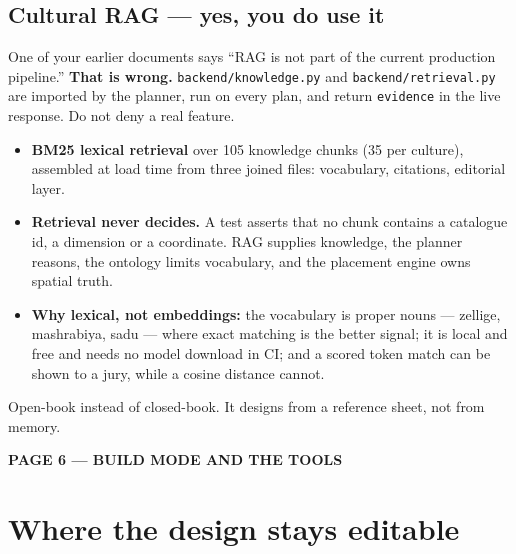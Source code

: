 \documentclass[10.5pt,a4paper]{article}
\newcommand{\pagelabel}[2]{%
  {\sffamily\bfseries\scriptsize\color{brass}\MakeUppercase{Page #1 --- #2}}\par\vspace{0.2em}}
\begin{document}
\subsection*{Cultural RAG --- yes, you do use it}
\begin{avoid}
One of your earlier documents says ``RAG is not part of the current production pipeline.''
\textbf{That is wrong.} \texttt{backend/knowledge.py} and \texttt{backend/retrieval.py} are imported
by the planner, run on every plan, and return \texttt{evidence} in the live response. Do not deny a
real feature.
\end{avoid}

\begin{itemize}[leftmargin=1.1em,itemsep=1pt]
  \item \textbf{BM25 lexical retrieval} over 105 knowledge chunks (35 per culture), assembled at
        load time from three joined files: vocabulary, citations, editorial layer.
  \item \textbf{Retrieval never decides.} A test asserts that no chunk contains a catalogue id, a
        dimension or a coordinate. RAG supplies knowledge, the planner reasons, the ontology limits
        vocabulary, and the placement engine owns spatial truth.
  \item \textbf{Why lexical, not embeddings:} the vocabulary is proper nouns --- zellige,
        mashrabiya, sadu --- where exact matching is the better signal; it is local and free and
        needs no model download in CI; and a scored token match can be shown to a jury, while a
        cosine distance cannot.
\end{itemize}

\begin{sayit}
Open-book instead of closed-book. It designs from a reference sheet, not from memory.
\end{sayit}

\newpage
\pagelabel{6}{build mode and the tools}
\section*{Where the design stays editable}
\end{document}
